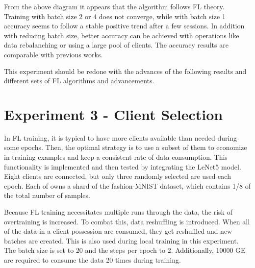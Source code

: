 From the above diagram it appears that the algorithm follows FL theory. Training with batch size 2 or 4 does not converge, while with batch size 1 accuracy seems to follow a stable positive trend after a few sessions. In addition with reducing batch size, better accuracy can be achieved with operations like data rebalanching or using a large pool of clients. The accuracy results are comparable with previous works.

\medskip
This experiment should be redone with the advances of the following results and different sets of FL algorithms and advancements.

\section{Experiment 3 - Client Selection}
In FL training, it is typical to have more clients available than needed during some epochs. Then, the optimal strategy is to use a subset of them to economize in training examples and keep a consistent rate of data consumption. This functionality is implemented and then tested by integrating the LeNet5 model. Eight clients are connected, but only three randomly selected are used each epoch. Each of owns a shard of the fashion-MNIST dataset, which contains 1/8 of the total number of samples. 

\medskip
Because FL training necessitates multiple runs through the data, the risk of overtraining is increased. To combat this, data reshuffling is introduced. When all of the data in a client possession are consumed, they get reshuffled and new batches are created. This is also used during local training in this experiment. The batch size is set to 20 and the steps per epoch to 2. Additionally, 10000 GE are required to consume the data 20 times during training.

\begin{center}
\end{center}

